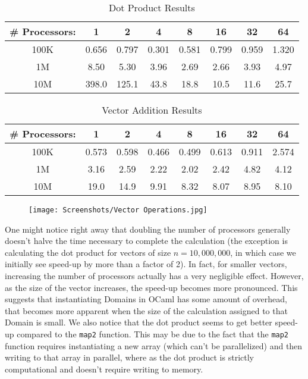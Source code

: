 \documentclass[pageno]{jpaper}
\begin{document}
\begin{doublespacing}
\begin{table}[h]
\centering
\begin{tabular}{|c|c|c|c|c|c|c|c|}
\hline
\# Processors: & 1 & 2 & 4 & 8 & 16 & 32 & 64 \\ \hline
100K & 0.656 & 0.797 & 0.301 & 0.581 & 0.799 & 0.959 & 1.320 \\ \hline
1M & 8.50 & 5.30 & 3.96 & 2.69 & 2.66 & 3.93 & 4.97 \\ \hline
10M & 398.0 & 125.1 & 43.8 & 18.8 & 10.5 & 11.6 & 25.7 \\ \hline
\end{tabular}
\label{table:1}
\caption{Dot Product Results}
\end{table}

\begin{table}[h]
\centering
\begin{tabular}{|c|c|c|c|c|c|c|c|}
\hline
\# Processors: & 1 & 2 & 4 & 8 & 16 & 32 & 64 \\ \hline
100K & 0.573 & 0.598 & 0.466 & 0.499 & 0.613 & 0.911 & 2.574 \\ \hline
1M & 3.16 & 2.59 & 2.22 & 2.02 & 2.42 & 4.82 & 4.12 \\ \hline
10M & 19.0 & 14.9 & 9.91 & 8.32 & 8.07 & 8.95 & 8.10 \\ \hline
\end{tabular}
\label{table:2}
\caption{Vector Addition Results}
\end{table}

\begin{figure}[h]
\centering
\texttt{[image: Screenshots/Vector Operations.jpg]}
\caption{}
\label{fig:vec-ops}
\end{figure}

One might notice right away that doubling the number of processors generally doesn't halve the time necessary to complete the calculation (the exception is calculating the dot product for vectors of size $n = 10,000,000$, in which case we initially see speed-up by more than a factor of 2). In fact, for smaller vectors, increasing the number of processors actually has a very negligible effect. However, as the size of the vector increases, the speed-up becomes more pronounced. This suggests that instantiating Domains in OCaml has some amount of overhead, that becomes more apparent when the size of the calculation assigned to that Domain is small. We also notice that the dot product seems to get better speed-up compared to the \verb|map2| function. This may be due to the fact that the \verb|map2| function requires instantiating a new array (which can't be parallelized) and then writing to that array in parallel, where as the dot product is strictly computational and doesn't require writing to memory.


\end{doublespacing}
\end{document}
